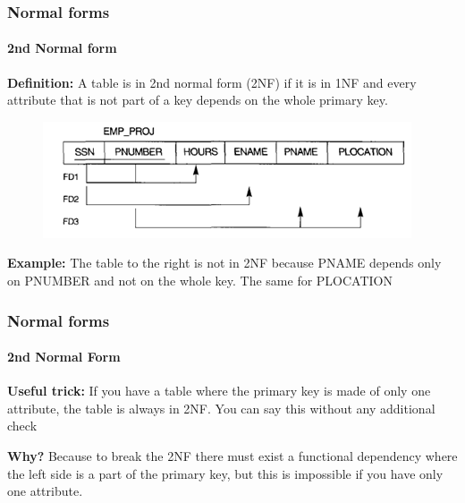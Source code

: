 \documentclass{beamer}
\begin{document}
\begin{frame}
	\frametitle{Normal forms}
	\framesubtitle{2nd Normal form}
	
	\textbf{Definition:}
	A table is in 2nd normal form (2NF) if it is in 1NF and every attribute that is not part of a key depends on the whole primary key.
	
	\begin{figure}
		\begin{center}
			\includegraphics[scale=0.5]{img/normalization/norm8}
		\end{center}
	\end{figure}
	
	\textbf{Example:}
	The table to the right is not in 2NF because PNAME depends only on PNUMBER and not on the whole key. The same for PLOCATION
	
\end{frame}

\begin{frame}
	\frametitle{Normal forms}
	\framesubtitle{2nd Normal Form}
	
	\textbf{Useful trick:}
	If you have a table where the primary key is made of only one attribute, the table is always in 2NF. You can say this without any additional check
	
	\textbf{Why?}
	\pause
	Because to break the 2NF there must exist a functional dependency where the left side is a part of the primary key, but this is impossible if you have only one attribute.
\end{frame}
\end{document}
